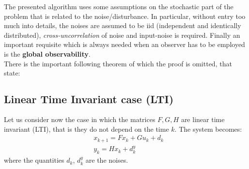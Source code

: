 The presented algorithm uses some assumptions on the stochastic part of the problem that is related to the noise/disturbance. In particular, without entry too much into details, the noises are assumed to be iid (independent and identically distributed), \textit{cross-uncorrelation} of noise and input-noise is required. Finally an important requisite which is always needed when an observer has to be employed is the \textbf{global observability}. \\
There is the important following theorem of which the proof is omitted, that state:\\

\hspace*{-5mm}
%

\subsection{Linear Time Invariant case (LTI)}
Let us consider now the case in which the matrices $F, G, H$ are linear time invariant (LTI), that is they do not depend on the time $k$. The system becomes:
\begin{equation}
    \begin{aligned}
        &x_{k+1} = Fx_k + Gu_k + d_k\\
        &y_k = H x_k + d_k^y
    \end{aligned}
\end{equation}
where the quantities $d_k$, $d_k^y$ are the noises. 

